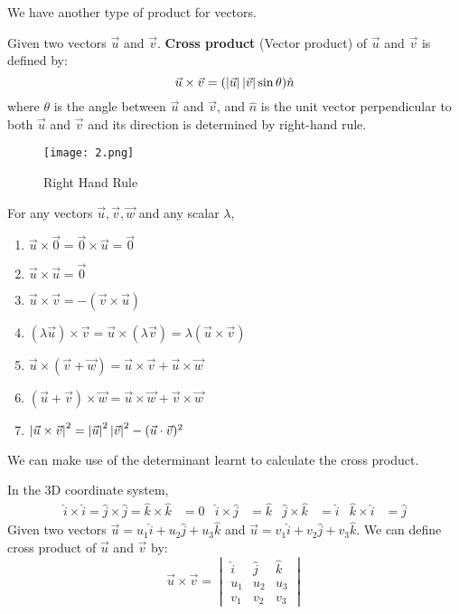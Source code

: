 \documentclass{huhtakm-template-book}
\begin{document}
We have another type of product for vectors.
\begin{defn}
    Given two vectors $\vec{u}$ and $\vec{v}$. \textbf{Cross product} (Vector product) of $\vec{u}$ and $\vec{v}$ is defined by:
    \begin{equation*}
        \vec{u}\times\vec{v}=(\left|{\vec{u}}\right|\left|{\vec{v}}\right|\sin\theta)\hat{n}
    \end{equation*}
    where $\theta$ is the angle between $\vec{u}$ and $\vec{v}$, and $\hat{n}$ is the unit vector perpendicular to both $\vec{u}$ and $\vec{v}$ and its direction is determined by right-hand rule.
\end{defn}
\begin{figure}[h!]
    \centering
    \texttt{[image: 2.png]}
    \caption{Right Hand Rule}
    \label{fig:right-hand rule}
\end{figure}
\begin{lem}
    For any vectors $\vec{u},\vec{v},\vec{w}$ and any scalar $\lambda$,
    \begin{enumerate}
        \item $\vec{u}\times\vec{0}=\vec{0}\times\vec{u}=\vec{0}$
        \item $\vec{u}\times\vec{u}=\vec{0}$
        \item $\vec{u}\times\vec{v}=-(\vec{v}\times\vec{u})$
        \item $(\lambda\vec{u})\times\vec{v}=\vec{u}\times(\lambda\vec{v})=\lambda(\vec{u}\times\vec{v})$
        \item $\vec{u}\times(\vec{v}+\vec{w})=\vec{u}\times\vec{v}+\vec{u}\times\vec{w}$
        \item $(\vec{u}+\vec{v})\times\vec{w}=\vec{u}\times\vec{w}+\vec{v}\times\vec{w}$
        \item $\left|{\vec{u}\times\vec{v}}\right|^{2}=\left|{\vec{u}}\right|^{2}\left|{\vec{v}}\right|^{2}-(\vec{u}\cdot\vec{v})^{2}$
    \end{enumerate}
\end{lem}
\newpage
We can make use of the determinant learnt to calculate the cross product.
\begin{lem}
    In the 3D coordinate system,
    \begin{align*}
        \hat{i}\times\hat{i}=\hat{j}\times\hat{j}=\hat{k}\times\hat{k}&=0 & \hat{i}\times\hat{j}&=\hat{k} & \hat{j}\times\hat{k}&=\hat{i} & \hat{k}\times\hat{i}&=\hat{j}
    \end{align*}
    Given two vectors $\vec{u}=u_{1}\hat{i}+u_{2}\hat{j}+u_{3}\hat{k}$ and $\vec{u}=v_{1}\hat{i}+v_{2}\hat{j}+v_{3}\hat{k}$. We can define cross product of $\vec{u}$ and $\vec{v}$ by:
    \begin{equation*}
        \vec{u}\times\vec{v}=\begin{vmatrix}
            \hat{i} & \hat{j} & \hat{k}\\
            u_{1} & u_{2} & u_{3}\\
            v_{1} & v_{2} & v_{3}
        \end{vmatrix}
    \end{equation*}
\end{lem}
\end{document}
